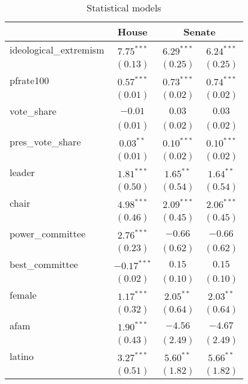 \documentclass[12pt]{article}
\begin{document}
\begin{table}
	\begin{center}
		\caption{Statistical models}
		\begin{tabular}{l c c c }
			\hline
			& House & \multicolumn{2}{c}{Senate} \\
			\hline
			ideological\_extremism & $7.75^{***}$  & $6.29^{***}$  & $6.24^{***}$  \\
			& $(0.13)$      & $(0.25)$      & $(0.25)$      \\
			pfrate100              & $0.57^{***}$  & $0.73^{***}$  & $0.74^{***}$  \\
			& $(0.01)$      & $(0.02)$      & $(0.02)$      \\
			vote\_share            & $-0.01$       & $0.03$        & $0.03$        \\
			& $(0.01)$      & $(0.02)$      & $(0.02)$      \\
			pres\_vote\_share      & $0.03^{**}$   & $0.10^{***}$  & $0.10^{***}$  \\
			& $(0.01)$      & $(0.02)$      & $(0.02)$      \\
			leader                 & $1.81^{***}$  & $1.65^{**}$   & $1.64^{**}$   \\
			& $(0.50)$      & $(0.54)$      & $(0.54)$      \\
			chair                  & $4.98^{***}$  & $2.09^{***}$  & $2.06^{***}$  \\
			& $(0.46)$      & $(0.45)$      & $(0.45)$      \\
			power\_committee       & $2.76^{***}$  & $-0.66$       & $-0.66$       \\
			& $(0.23)$      & $(0.62)$      & $(0.62)$      \\
			best\_committee        & $-0.17^{***}$ & $0.15$        & $0.15$        \\
			& $(0.02)$      & $(0.10)$      & $(0.10)$      \\
			female                 & $1.17^{***}$  & $2.05^{**}$   & $2.03^{**}$   \\
			& $(0.32)$      & $(0.64)$      & $(0.64)$      \\
			afam                   & $1.90^{***}$  & $-4.56$       & $-4.67$       \\
			& $(0.43)$      & $(2.49)$      & $(2.49)$      \\
			latino                 & $3.27^{***}$  & $5.60^{**}$   & $5.66^{**}$   \\
			& $(0.51)$      & $(1.82)$      & $(1.82)$      \\

\end{tabular}
\end{center}
\end{table}
\end{document}
